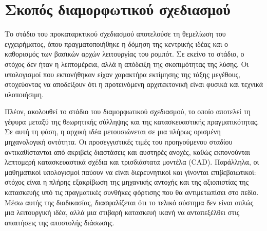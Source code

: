 \section{Σκοπός διαμορφωτικού σχεδιασμού}

Το στάδιο του προκαταρκτικού σχεδιασμού αποτελούσε τη θεμελίωση του εγχειρήματος, όπου πραγματοποιήθηκε η δόμηση της κεντρικής ιδέας και ο καθορισμός των βασικών αρχών λειτουργίας του ρομπότ. Σε εκείνο το στάδιο, ο στόχος δεν ήταν η λεπτομέρεια, αλλά η απόδειξη της σκοπιμότητας της λύσης. Οι υπολογισμοί που εκπονήθηκαν είχαν χαρακτήρα εκτίμησης της τάξης μεγέθους, στοχεύοντας να αποδείξουν ότι η προτεινόμενη αρχιτεκτονική είναι φυσικά και τεχνικά υλοποιήσιμη.

\par Πλέον, ακολουθεί το στάδιο του διαμορφωτικού σχεδιασμού, το οποίο αποτελεί τη γέφυρα μεταξύ της θεωρητικής σύλληψης και της κατασκευαστικής πραγματικότητας. Σε αυτή τη φάση, η αρχική ιδέα μετουσιώνεται σε μια πλήρως ορισμένη μηχανολογική οντότητα. Οι προσεγγιστικές τιμές του προηγούμενου σταδίου αντικαθίστανται από ακριβείς διαστάσεις και αυστηρές ανοχές, καθώς εκπονούνται λεπτομερή κατασκευαστικά σχέδια και τρισδιάστατα μοντέλα (CAD). Παράλληλα, οι μαθηματικοί υπολογισμοί παύουν να είναι διερευνητικοί και γίνονται επιβεβαιωτικοί: στόχος είναι η πλήρης εξακρίβωση της μηχανικής αντοχής και της αξιοπιστίας της κατασκευής υπό τις πραγματικές συνθήκες φόρτισης που θα αντιμετωπίσει στο πεδίο. Μέσω αυτής της διαδικασίας, διασφαλίζεται ότι το τελικό σύστημα δεν είναι απλώς μια λειτουργική ιδέα, αλλά μια στιβαρή κατασκευή ικανή να ανταπεξέλθει στις απαιτήσεις της αποστολής διάσωσης.


